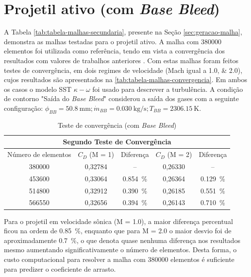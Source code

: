 \section{Projetil ativo (com \textit{Base Bleed})}\label{sec:resultados-com-basebleed}

A Tabela \ref{tab:tabela-malhas-secundaria}, presente na Seção \ref{sec:geracao-malha}, demonstra as malhas testadas para o projetil ativo. A malha com \num{380000} elementos foi utilizada como referência, tendo em vista a convergência dos resultados com valores de trabalhos anteriores \cite{Mahmoud2009}. Com estas malhas foram feitos testes de convergência, em dois regimes de velocidade (Mach igual a \numlist{1,0;2,0}), cujos resultados são apresentados na \autoref{tab:tabela-malhas-convergencia}. Em ambos os casos o modelo SST \(\kappa-\omega\) foi usado para descrever a turbulência. A condição de contorno "Saída do \textit{Base Bleed}"{} considerou a saída dos gases com a seguinte configuração: \(\phi_{BB} = \qty{50,8}{\milli\metre}; \Dot{m}_{BB} = \qty{0,030}{\kilogram\per\second}; T_{BB} = \qty{2306,15}{\kelvin}\).

\begin{table}[ht]
\centering
\caption[Teste de convergência (com \textit{Base Bleed})]{Teste de convergência (com \textit{Base Bleed})}
\vspace{0.5cm}
\begin{tabular}{c|c|c|c|c}
\multicolumn{5}{c}{Segundo Teste de Convergência} \\
\hline 
Número de elementos & \(C_{D}\) (M = \num{1}) & Diferença & \(C_{D}\) (M = \num{2}) & Diferença\\ 
\hline
\num{380000} & 0,32784 & -- & 0,26330 & --\\
\num{453600} & 0,33064 & \qty{0,854}{\percent} & 0,26364 & \qty{0,129}{\percent}\\
\num{514800} & 0,32912 & \qty{0,390}{\percent} & 0,26185 & \qty{0,551}{\percent}\\
\num{566550} & 0,32656 & \qty{0,394}{\percent} & 0,26143 & \qty{0,710}{\percent}\\
\end{tabular}
\label{tab:tabela-malhas-convergencia}
\end{table}

Para o projetil em velocidade sônica (M = \num{1,0}), a maior diferença percentual ficou na ordem de \qty{0,85}{\percent}, enquanto que para M = \num{2,0} o maior desvio foi de aproximadamente \qty{0,7}{\percent}, o que denota quase nenhuma diferença nos resultados mesmo aumentando significativamente o número de elementos. Desta forma, o custo computacional para resolver a malha com \num{380000} elementos é suficiente para predizer o coeficiente de arrasto.

